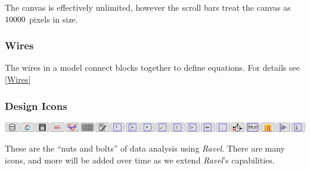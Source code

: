 The canvas is effectively unlimited, however the scroll bars treat
the canvas as $10000\time10000$ pixels in size.

\subsubsection{Wires}

The wires in a model connect blocks together to define equations.
For details see \ref{Wires}

\subsubsection{Design Icons}

\noindent\includegraphics[width=\textwidth]{images/DesignIcons}

These are the ``nuts and bolts'' of data analysis using \emph{Ravel}.
There are many icons, and more will be added over time as we extend
\emph{Ravel}'s capabilities.

